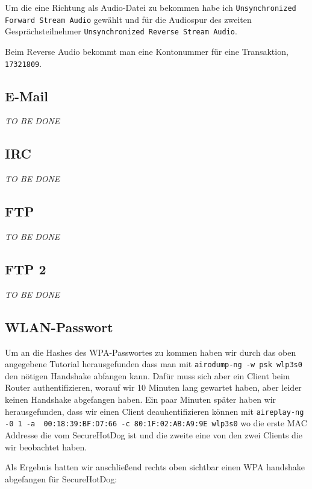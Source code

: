 \documentclass[12pt,a4paper,titlepage,oneside]{scrartcl}
\begin{document}
Um die eine Richtung als Audio-Datei zu bekommen habe ich \lstinline{Unsynchronized Forward Stream Audio} gewählt und für die Audiospur des zweiten Gesprächsteilnehmer \lstinline{Unsynchronized Reverse Stream Audio}.

Beim Reverse Audio bekommt man eine Kontonummer für eine Transaktion, \lstinline{17321809}.

\subsection{E-Mail}
\emph{TO BE DONE}

\subsection{IRC}
\emph{TO BE DONE}

\subsection{FTP}
\emph{TO BE DONE}

\subsection{FTP 2}
\emph{TO BE DONE}

\subsection{WLAN-Passwort}

Um an die Hashes des WPA-Passwortes zu kommen haben wir durch das oben angegebene Tutorial herausgefunden dass man mit \lstinline{airodump-ng -w psk wlp3s0} den nötigen Handshake abfangen kann. Dafür muss sich aber ein Client beim Router authentifizieren, worauf wir 10 Minuten lang gewartet haben, aber leider keinen Handshake abgefangen haben. Ein paar Minuten später haben wir herausgefunden, dass wir einen Client deauhentifizieren können mit \lstinline{aireplay-ng -0 1 -a  00:18:39:BF:D7:66 -c 80:1F:02:AB:A9:9E wlp3s0} wo die erste MAC Addresse die vom SecureHotDog ist und die zweite eine von den zwei Clients die wir beobachtet haben.

Als Ergebnis hatten wir anschließend rechts oben sichtbar einen WPA handshake abgefangen für SecureHotDog:
\end{document}
